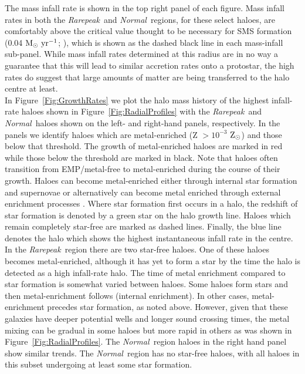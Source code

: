 \documentclass[twocolumn,iop,revtex4]{openjournal}
\newcommand{\msolaryrc} {$\rm{M_{\odot}~yr^{-1}}$}
\newcommand{\zsolarc} {$\rm{Z_{\odot}}$}
\newcommand{\rarepeak} {\textit{Rarepeak~}}
\newcommand{\normal} {\textit{Normal~}}
\begin{document}
\indent The mass infall rate is shown in the top right panel of each figure. 
Mass infall rates in both the \rarepeak and \normal regions, for these select haloes, are
comfortably above the critical value thought to be necessary for SMS formation (0.04
\msolaryrc; \citealt{Sakurai_2016}), which is shown as the dashed black line in each mass-infall sub-panel.
While mass infall rates determined at this radius are in no
way a guarantee that this will lead to similar accretion rates onto a protostar, the high rates do
suggest that large amounts of matter are being transferred to the halo centre at least. \\
\indent In Figure~\ref{Fig:GrowthRates} we plot the halo mass history of the highest
infall-rate haloes shown in Figure~\ref{Fig:RadialProfiles} with the \rarepeak and \normal haloes
shown on the left- and right-hand panels, respectively. In the panels we identify haloes which
are metal-enriched (Z $> 10^{-3}$ \zsolarc) and those below that threshold. The growth of
metal-enriched haloes are marked in red while those below the threshold are marked in black. Note
that haloes often transition from EMP/metal-free to metal-enriched during the course of their growth. 
Haloes can become metal-enriched either through internal star formation and
supernovae or alternatively can become metal enriched through external enrichment processes
\citep[e.g.,][]{Smith_2015}. Where star formation first
occurs in a halo, the redshift of star formation is denoted by a green star on the halo growth line. 
Haloes which remain completely star-free are marked as dashed lines. Finally, the blue line denotes
the halo which shows the highest instantaneous infall rate in the centre. \\
\indent In the \rarepeak region there are two
star-free haloes. One of these haloes becomes metal-enriched, although it has yet to form
a star by the time the halo is detected as a high infall-rate halo. The time of metal enrichment
compared to star formation is somewhat varied between haloes. Some haloes form stars and then
metal-enrichment follows (internal enrichment). In other cases, metal-enrichment precedes
star formation, as noted above.
However, given that these galaxies have deeper potential wells and longer sound crossing times,
the metal mixing can be gradual in some haloes but more rapid in others as was shown in Figure~\ref{Fig:RadialProfiles}.
The \normal region haloes in the right hand panel show similar trends.
The \normal region has no star-free haloes, with all haloes in this subset undergoing at
least some star formation.
\end{document}
